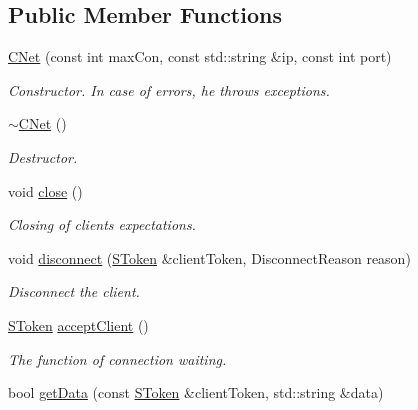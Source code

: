 \subsection*{Public Member Functions}
\begin{DoxyCompactItemize}
\item 
\mbox{\hyperlink{class_net_1_1_c_net_a2e7bdcc29f062828ecac6f2caa1bbf5c}{C\+Net}} (const int max\+Con, const std\+::string \&ip, const int port)
\begin{DoxyCompactList}\small\item\em Constructor. In case of errors, he throws exceptions. \end{DoxyCompactList}\item 
\mbox{\label{class_net_1_1_c_net_a324846d932eefbfe5316ea53f66a69dd}} 
\mbox{\hyperlink{class_net_1_1_c_net_a324846d932eefbfe5316ea53f66a69dd}{$\sim$\+C\+Net}} ()
\begin{DoxyCompactList}\small\item\em Destructor. \end{DoxyCompactList}\item 
\mbox{\label{class_net_1_1_c_net_a7dbe5d1a571964634d88596d7c6e7c2f}} 
void \mbox{\hyperlink{class_net_1_1_c_net_a7dbe5d1a571964634d88596d7c6e7c2f}{close}} ()
\begin{DoxyCompactList}\small\item\em Closing of clients\textquotesingle{} expectations. \end{DoxyCompactList}\item 
void \mbox{\hyperlink{class_net_1_1_c_net_a7f66009e63ed53b541331143bb2f4bfb}{disconnect}} (\mbox{\hyperlink{struct_net_1_1_s_token}{S\+Token}} \&client\+Token, Disconnect\+Reason reason)
\begin{DoxyCompactList}\small\item\em Disconnect the client. \end{DoxyCompactList}\item 
\mbox{\hyperlink{struct_net_1_1_s_token}{S\+Token}} \mbox{\hyperlink{class_net_1_1_c_net_a802a6ab154226caaa8d70423374b8034}{accept\+Client}} ()
\begin{DoxyCompactList}\small\item\em The function of connection waiting. \end{DoxyCompactList}\item 
bool \mbox{\hyperlink{class_net_1_1_c_net_a77d474d293656443de888283db8a74f0}{get\+Data}} (const \mbox{\hyperlink{struct_net_1_1_s_token}{S\+Token}} \&client\+Token, std\+::string \&data)

\end{DoxyCompactItemize}
